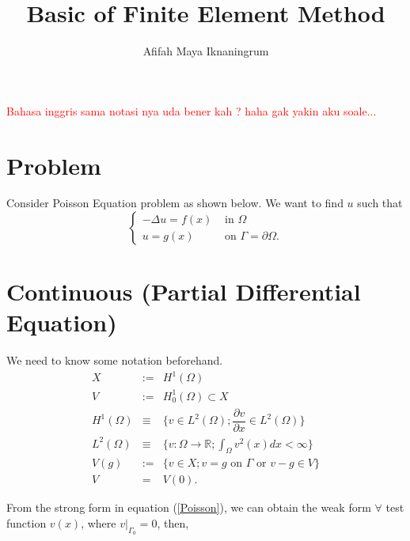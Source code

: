 \documentclass[]{report}
\title{Basic of Finite Element Method}
\author{Afifah Maya Iknaningrum}
\begin{document}

\textcolor{red}{Bahasa inggris sama notasi nya uda bener kah ? haha gak yakin aku soale...}

\section{Problem}
Consider Poisson Equation problem as shown below. We want to find $ u $ such that
\begin{equation}\label{Poisson}
\begin{cases}
-\Delta u = f(x) & \text{ in } \Omega \\
u = g(x) & \text{ on } \Gamma = \partial \Omega.
\end{cases}
\end{equation}

\section{Continuous (Partial Differential Equation)}
We need to know some notation beforehand.
\begin{eqnarray}\label{notation} \nonumber
X &:=& H^{1}(\Omega) \\ \nonumber
V &:=& H^{1}_{0}(\Omega) \subset X \\ \nonumber
H^{1}(\Omega) &\equiv& \{ v \in L^{2}(\Omega) ; \dfrac{\partial v}{\partial x} \in L^{2}(\Omega) \} \\ \nonumber
L^{2}(\Omega) &\equiv& \{ v: \Omega \rightarrow \mathbb{R} ;  \int_{\Omega} v^{2}(x) dx < \infty \} \\ \nonumber
V(g) &:=& \{ v \in X ; v=g \text{ on } \Gamma \text{ or } v-g \in V \} \\ \nonumber
V &=& V(0).
\end{eqnarray}

From the strong form in equation (\ref{Poisson}), we can obtain the weak form
$ \forall $ test function $ v(x) $, where $ v|_{\Gamma_0} = 0 $, then,
\end{document}
